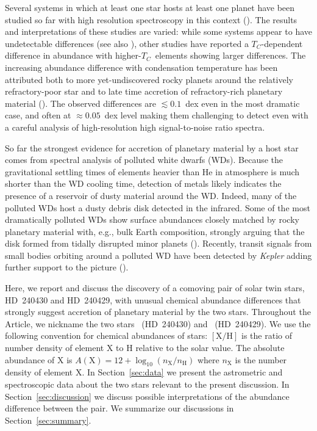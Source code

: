 \documentclass[modern, letterpaper]{aastex61}
\newcommand{\project}[1]{\textsl{#1}}
\newcommand{\documentname}{Article}
\newcommand{\sectionname}{Section}
\newcommand*\elem[1]{\ensuremath{\mathrm{#1}}}
\newcommand*\elemH[1]{\ensuremath{[\mathrm{#1}/\elem{H}]}}
\newcommand{\sunanalog}{\text{Krios}}
\newcommand{\bizarreone}{\text{Kronos}}
\newcommand{\Tcondens}{\ensuremath{T_C}}
\begin{document}
Several systems in which at least one star hosts at least one planet
have been studied so far with high resolution spectroscopy in this context
(\citealt{Teske:2013aa,Mack:2014aa,Liu:2014aa,Teske:2015aa,Saffe:2015aa,
  Ramirez:2015aa,Biazzo:2015aa,Mack:2016aa,Teske:2016aa,Teske:2016ab}).
The results and interpretations of these studies are varied:
while some systems appear to have undetectable differences
(see also \citealt{Desidera:2004aa,Gratton:2001aa}), other
studies have reported a \Tcondens-dependent difference in abundance
with higher-\Tcondens\ elements showing larger differences.
The increasing abundance difference with condensation temperature has been
attributed both to more yet-undiscovered rocky planets around the relatively
refractory-poor star and to late time accretion of refractory-rich planetary
material (\citealt{Ramirez:2015aa,Biazzo:2015aa}).
The observed differences are $\lesssim 0.1$~dex even in the most dramatic case,
and often at $\approx 0.05$~dex level making them challenging to detect even
with a careful analysis of high-resolution high signal-to-noise ratio spectra.

So far the strongest evidence for accretion of planetary material by a host
star comes from spectral analysis of polluted white dwarfs (WDs).
Because the gravitational settling times of elements heavier than \elem{He} in
atmosphere is much shorter than the WD cooling time, detection of metals likely
indicates the presence of a reservoir of dusty material around the WD.
Indeed, many of the polluted WDs host a dusty debris disk detected
in the infrared.
Some of the most dramatically polluted WDs show
surface abundances closely matched by rocky planetary material
with, e.g., bulk Earth composition, strongly arguing
that the disk formed from tidally disrupted minor planets
(\citealt{Zuckerman:2007aa,Klein:2010aa}).
Recently, transit signals from small bodies orbiting around a polluted WD
have been detected by \project{Kepler} adding further support to the picture
(\citealt{2015Natur.526..546V}).

Here, we report and discuss the discovery of a comoving pair of solar twin stars,
HD~240430 and HD~240429, with unusual chemical abundance differences
that strongly suggest accretion of planetary material by the two stars.
Throughout the \documentname, we nickname the two stars \bizarreone\
(HD~240430) and \sunanalog\ (HD~240429).
We use the following convention for chemical abundances of stars: \elemH{X} is
the ratio of number density of element \elem{X} to \elem{H} relative to the
solar value.
The absolute abundance of \elem{X} is $A(\elem{X}) = 12 + \log_{10}
(n_\elem{X}/n_\elem{H})$ where $n_\elem{X}$ is the number density of element
\elem{X}.
In \sectionname~\ref{sec:data} we present the astrometric and spectroscopic data
about the two stars relevant to the present discussion.
In \sectionname~\ref{sec:discussion} we discuss possible interpretations of
the abundance difference between the pair.
We summarize our discussions in \sectionname~\ref{sec:summary}.
\end{document}
